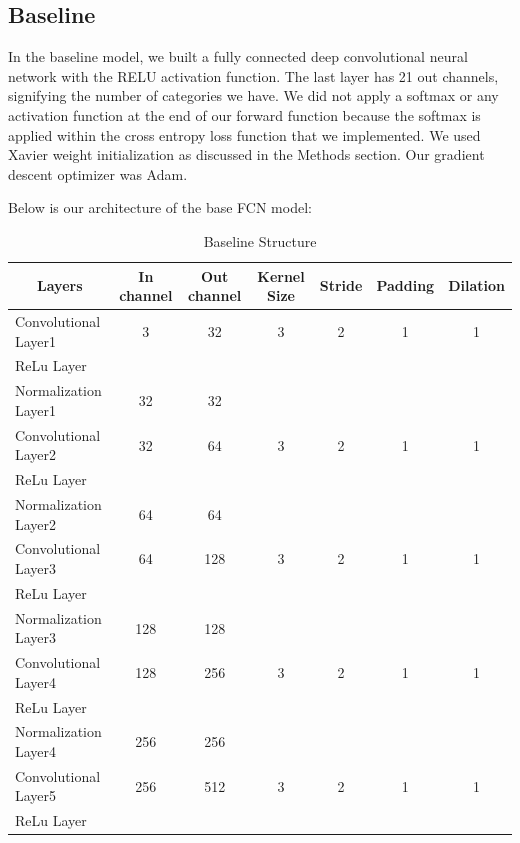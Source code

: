 \documentclass{article}
\begin{document}
\subsection{Baseline}

In the baseline model, we built a fully connected deep convolutional neural network with the RELU activation function. The last layer has 21 out channels, signifying the number of categories we have. We did not apply a softmax or any activation function at the end of our forward function because the softmax is applied within the cross entropy loss function that we implemented. We used Xavier weight initialization as discussed in the Methods section. Our gradient descent optimizer was Adam.

Below is our architecture of the base FCN model:

\begin{table}[H]
  \centering
  \caption{Baseline Structure}
    \begin{tabular}{lcccccc}
    \toprule
    \multicolumn{1}{c}{Layers} & In channel & Out channel & Kernel Size & Stride & Padding & Dilation \\
    \midrule
    Convolutional Layer1 & 3     & 32    & 3     & 2     & 1     & 1 \\
    ReLu Layer &       &       &       &       &       &  \\
    Normalization Layer1 & 32    & 32    &       &       &       &  \\
    Convolutional Layer2 & 32    & 64    & 3     & 2     & 1     & 1 \\
    ReLu Layer &       &       &       &       &       &  \\
    Normalization Layer2 & 64    & 64    &       &       &       &  \\
    Convolutional Layer3 & 64    & 128   & 3     & 2     & 1     & 1 \\
    ReLu Layer &       &       &       &       &       &  \\
    Normalization Layer3 & 128   & 128   &       &       &       &  \\
    Convolutional Layer4 & 128   & 256   & 3     & 2     & 1     & 1 \\
    ReLu Layer &       &       &       &       &       &  \\
    Normalization Layer4 & 256   & 256   &       &       &       &  \\
    Convolutional Layer5 & 256   & 512   & 3     & 2     & 1     & 1 \\
    ReLu Layer &       &       &       &       &       &  \\

\end{tabular}
\end{table}
\end{document}
